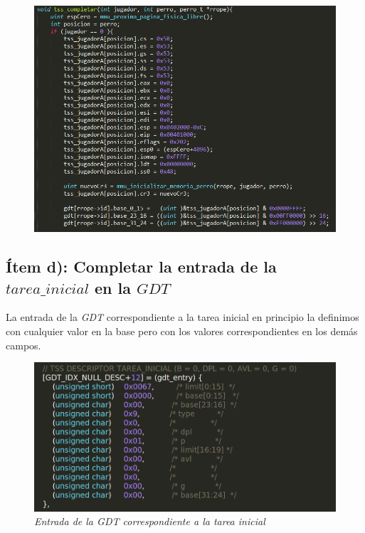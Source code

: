 \begin{figure}[H]
\begin{center}
\includegraphics[width=\linewidth]{ejercicio6/tss_perro.png}
\caption{{\small }}
\endminipage
\end{center}
\end{figure}


\subsection{Ítem d): Completar la entrada de la $tarea\_inicial$ en la $GDT$}

La entrada de la \textit{GDT} correspondiente a la tarea inicial en principio la definimos con cualquier valor  en la base pero con los valores correspondientes en los demás campos.

\begin{figure}[H]
\begin{center}
\includegraphics[width=\linewidth]{ejercicio6/gdt_tarea_inicial.png}
\caption{{\small \textit{Entrada de la \textit{GDT} correspondiente a la tarea inicial }}}
\endminipage
\end{center}
\end{figure}



